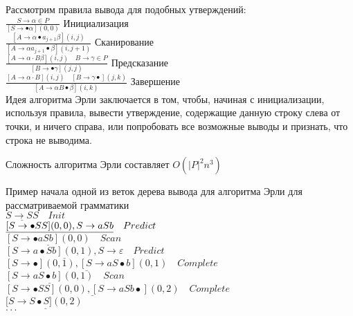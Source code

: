 Рассмотрим правила вывода для подобных утверждений:\\

$\frac{S \rightarrow \alpha \in P}{[S \rightarrow \bullet \alpha](0,0)}$ Инициализация\\

$\frac{\left[A \rightarrow \alpha \bullet a_{j+1} \beta\right](i, j)}{\left[A \rightarrow \alpha a_{j+1} \bullet \beta\right](i, j+1)}$ Сканирование\\

$\frac{[A \rightarrow \alpha \cdot B \beta](i, j) \quad B \rightarrow \gamma \in P}{[B \rightarrow \bullet \gamma](j, j)}$ Предсказание\\

$\frac{[A \rightarrow \alpha \cdot B](i, j) \quad[B \rightarrow \gamma \bullet](j, k)}{[A \rightarrow \alpha B \bullet \beta](i, k)}$ Завершение\\

Идея алгоритма Эрли заключается в том, чтобы, начиная с инициализации, используя правила, вывести утверждение, содержащие данную строку слева от точки, и ничего справа, или попробовать все возможные выводы и признать, что строка не выводима.

Сложность алгоритма Эрли составляет $O(|P|^2n^3)$

\begin{example} Пример начала одной из веток дерева вывода для алгоритма Эрли для рассматриваемой грамматики\\
	
	$\underline{S \rightarrow SS} \quad Init$\\
	$\underline{[S \rightarrow \bullet SS](0,0), \space S \rightarrow aSb} \quad Predict$\\
	$\underline{[S \rightarrow \bullet aSb](0,0)} \quad Scan$\\
	$\underline{[S \rightarrow a \bullet Sb](0,1), S \rightarrow \varepsilon} \quad Predict$\\
	$\underline{[S \rightarrow \bullet](0, 1), [S \rightarrow aS \bullet b](0,1)} \quad Complete$\\
	$\underline{[S \rightarrow aS \bullet b](0,1)} \quad Scan$\\
	$\underline{[S \rightarrow \bullet SS](0,0),[S \rightarrow aSb \bullet](0,2)} \quad Complete$\\
	$[\underline{S \rightarrow S \bullet S](0,2)}$\\
	$\cdot\cdot\cdot$
	
\end{example}

